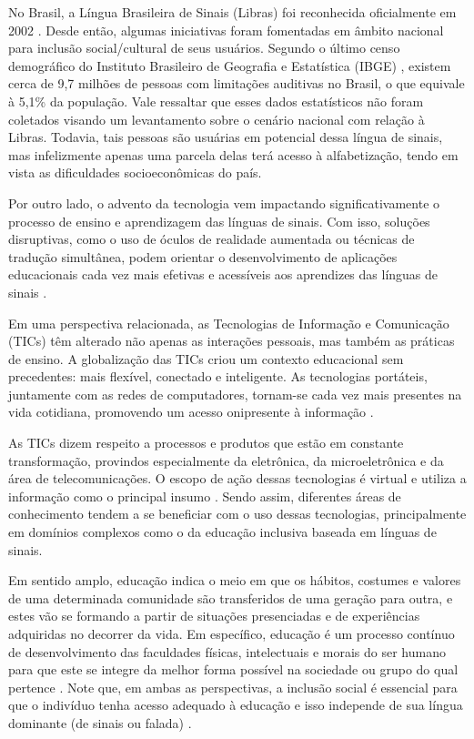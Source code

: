 No Brasil, a Língua Brasileira de Sinais (Libras) foi reconhecida oficialmente em 2002 \cite{Honora2017,Quadros2019}. Desde então, algumas iniciativas foram fomentadas em âmbito nacional para inclusão social/cultural de seus usuários. Segundo o último censo demográfico do Instituto Brasileiro de Geografia e Estatística (IBGE) \cite{IBGE2010}, existem cerca de 9,7 milhões de pessoas com limitações auditivas no Brasil, o que equivale à 5,1\% da população. Vale ressaltar que esses dados estatísticos não foram coletados visando um levantamento sobre o cenário nacional com relação à Libras. Todavia, tais pessoas são usuárias em potencial dessa língua de sinais, mas infelizmente apenas uma parcela delas terá acesso à alfabetização, tendo em vista as dificuldades socioeconômicas do país.

Por outro lado, o advento da tecnologia vem impactando significativamente o processo de ensino e aprendizagem das línguas de sinais. Com isso, soluções disruptivas, como o uso de óculos de realidade aumentada ou técnicas de tradução simultânea, podem orientar o desenvolvimento de aplicações educacionais cada vez mais efetivas e acessíveis aos aprendizes das línguas de sinais \cite{Napier2019}.

Em uma perspectiva relacionada, as Tecnologias de Informação e Comunicação (TICs) têm alterado não apenas as interações pessoais, mas também as práticas de ensino. A globalização das TICs criou um contexto educacional sem precedentes: mais flexível, conectado e inteligente. As tecnologias portáteis, juntamente com as redes de computadores, tornam-se cada vez mais presentes na vida cotidiana, promovendo um acesso onipresente à informação \cite{Cilli2017}.

As TICs dizem respeito a processos e produtos que estão em constante transformação, provindos especialmente da eletrônica, da microeletrônica e da área de telecomunicações. O escopo de ação dessas tecnologias é virtual e utiliza a informação como o principal insumo \cite{Cilli2017}. Sendo assim, diferentes áreas de conhecimento tendem a se beneficiar com o uso dessas tecnologias, principalmente em domínios complexos como o da educação inclusiva baseada em línguas de sinais.

Em sentido amplo, educação indica o meio em que os hábitos, costumes e valores de uma determinada comunidade são transferidos de uma geração para outra, e estes vão se formando a partir de situações presenciadas e de experiências adquiridas no decorrer da vida. Em específico, educação é um processo contínuo de desenvolvimento das faculdades físicas, intelectuais e morais do ser humano para que este se integre da melhor forma possível na sociedade ou grupo do qual pertence \cite{Cilli2017,Quadros2019}. Note que, em ambas as perspectivas, a inclusão social é essencial para que o indivíduo tenha acesso adequado à educação e isso independe de sua língua dominante (de sinais ou falada) \cite{Quadros2019}. 

